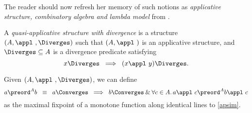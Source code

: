 The reader should now refresh her memory of such notions as {\em applicative structure, combinatory algebra {\rm and} lambda model} from \cite[Chapter 5]{Bar}.
\begin{definition}
{\rm A {\em quasi-applicative structure with divergence} is a structure $(A, \appl\ , \Diverges )$ such that $(A, \appl\ )$ is an applicative structure, and $\Diverges \subseteq A$ is a divergence predicate satisfying}
\[ x \Diverges \;\; \Longrightarrow \;\; (x\appl\ y)\Diverges . \]
\end{definition}
Given $(A, \appl\ , \Diverges )$, we can define
\[ a \preord^{A} b \;\; \equiv \;\; a \Converges \;\; \Longrightarrow \;\; 
b \Converges \: \& \: \forall c \in A. \, a\appl\ c \preord^{A} b\appl\ c \]
as the maximal fixpoint of a monotone function along identical lines to \ref{apsim}.

